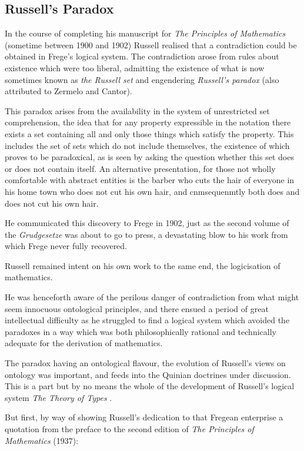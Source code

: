 \documentclass[10pt,titlepage]{book}
\begin{document}
\subsection{Russell's Paradox}

In the course of completing his manuscript for \emph{The Principles of Mathematics} (sometime between 1900 and 1902) Russell realised that a contradiction could be obtained in Frege's logical system.
The contradiction arose from rules about existence which were too liberal, admitting the existence of what is now sometimes known as {\it the Russell set} and engendering {\it Russell's paradox} (also attributed to Zermelo and Cantor).

This paradox arises from the availability in the system of unrestricted set comprehension, the idea that for any property expressible in the notation there exists a set containing all and only those things which satisfy the property.
This includes the set of sets which do not include themselves, the existence of which proves to be paradoxical, as is seen by asking the question whether this set does or does not contain itself.
An alternative presentation, for those not wholly comfortable with abstract entities is the barber who cuts the hair of everyone in his home town who does not cut his own hair, and cnmsequenmtly both does and does not cut his own hair.

He communicated this discovery to Frege in 1902, just as the second volume of the {\it Grudgesetze} was about to go to press, a devastating blow to his work from which Frege never fully recovered.

Russell remained intent on his own work to the same end, the logicisation of mathematics.

He was henceforth aware of the perilous danger of contradiction from what might seem innocuous ontological principles, and there ensued a period of great intellectual difficulty as he struggled to find a logical system which avoided the paradoxes in a way which was both philosophically rational and technically adequate for the derivation of mathematics.

The paradox having an ontological flavour, the evolution of Russell's views on ontology was important, and feeds into the Quinian doctrines under discussion.
This is a part but by no means the whole of the development of Russell's logical system {\it The Theory of Types} \cite{russell1908}.

But first, by way of showing Russell's dedication to that Fregean enterprise a quotation from the preface to the second edition of {\it The Principles of Mathematics} (1937):
\end{document}
